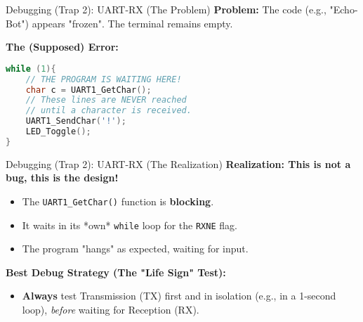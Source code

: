 \documentclass{beamer}
\begin{document}
\begin{frame}[fragile]{Debugging (Trap 2): UART-RX (The Problem)}
	\textbf{Problem:} The code (e.g., "Echo-Bot") appears "frozen". The terminal remains empty.
	
	\bigskip
	\textbf{The (Supposed) Error:}
	\begin{lstlisting}[language=C, style=mystyle]
while (1){
	// THE PROGRAM IS WAITING HERE!
	char c = UART1_GetChar(); 	
	// These lines are NEVER reached
	// until a character is received.
	UART1_SendChar('!'); 
	LED_Toggle();
}
	\end{lstlisting}
\end{frame}

\begin{frame}{Debugging (Trap 2): UART-RX (The Realization)}
\textbf{Realization: This is not a bug, this is the design!}
	\begin{itemize}
		\item The \texttt{UART1\_GetChar()} function is \textbf{blocking}.
		\item It waits in its *own* \texttt{while} loop for the \texttt{RXNE} flag.
		\item The program "hangs" as expected, waiting for input.
	\end{itemize}
	
	\medskip
	\textbf{Best Debug Strategy (The "Life Sign" Test):}
	\begin{itemize}
		\item \textbf{Always} test Transmission (TX) first and in isolation (e.g., in a 1-second loop), \textit{before} waiting for Reception (RX).
	\end{itemize}
\end{frame}
\end{document}

